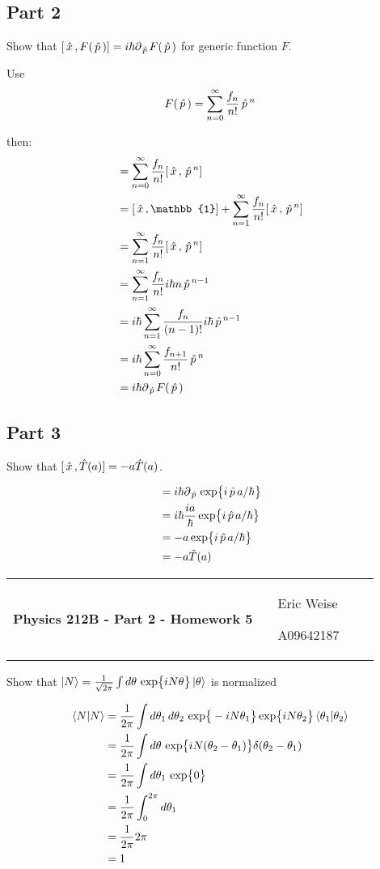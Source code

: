 \documentclass{article}
\newcommand{\assignment}[2]{
    \newpage
    \begin{tabular}{p{0.65\linewidth}p{0.25\linewidth}}
        {\bf\LARGE Physics 212B - Part #1 - Homework #2 }
        &
        \parbox[b]{0.24\textwidth}{
            \hfill Eric Weise

            \hfill A09642187
            }
    \end{tabular}
    \vspace{12pt}
    \newline
}
\newcommand{\D}[1]{{d#1 \,}}
\renewcommand{\exp}[1]{\,\text{exp} \big\{ #1 \big\} }
\begin{document}
\subsection*{Part 2}
Show that
\( [\, \hat{x} \,, F(\, \hat{p} \,)] = i\hbar\partial_{\, \hat{p} \,} F(\, \hat{p} \,) \)
for generic function $F$.

Use
\[ F(\, \hat{p} \,) = \sum_{n=0}^{\infty} \frac{f_n}{n!} \, \hat{p} \,^n \]

then:
\begin{align*}
    [\xopr, F(\popr)]
    &= \sum_{n=0}^{\infty} \frac{f_n}{n!} [\xopr, \popr^n ] \\
    &= [\xopr, \mathbb{1}]  + \sum_{n=1}^{\infty} \frac{f_n}{n!} [\xopr, \popr^n ] \\
    &= \sum_{n=1}^{\infty} \frac{f_n}{n!} [\xopr, \popr^n ] \\
    &= \sum_{n=1}^{\infty} \frac{f_n}{n!} i\hbar n \popr^{n-1} \\
    &= i\hbar \sum_{n=1}^{\infty} \frac{f_n}{(n-1)!} i\hbar \popr^{n-1} \\
    &= i\hbar \sum_{n=0}^{\infty} \frac{f_{n+1}}{n!} \popr^{n} \\
    &= i\hbar \partial_{\popr} F(\popr)
\end{align*}

\subsection*{Part 3}
Show that
\( [\, \hat{x} \,, \hat{T}(a) ] = -a \hat{T}(a) \).

\begin{align*}
    [\xopr, \hat{T}(a) ]
    &= i\hbar \partial_{\popr} \exp{i\popr a / \hbar} \\
    &= i\hbar \frac{i a}{\hbar} \exp{i\popr a / \hbar} \\
    &= -a \exp{i\popr a / \hbar} \\
    &= -a \hat{T}(a)
\end{align*}


\assignment{2}{5}
Show that
\( \ket{N} = \frac{1}{\sqrt{2\pi}} \int \D{\theta} \exp{i N \theta} \ket{\theta} \)
is normalized

\begin{align*}
    \braket{N|N}
    &= \frac{1}{2\pi} \int \D{\theta_1}\D{\theta_2} \exp{-i N \theta_1} \exp{i N \theta_2} \braket{\theta_1|\theta_2} \\
    &= \frac{1}{2\pi} \int \D{\theta} \exp{i N (\theta_2 - \theta_1)} \delta(\theta_2 - \theta_1) \\
    &= \frac{1}{2\pi} \int \D{\theta_1} \exp{0} \\
    &= \frac{1}{2\pi} \int_{0}^{2\pi} \D{\theta_1} \\
    &= \frac{1}{2\pi} 2\pi \\
    &= 1
\end{align*}
\end{document}
